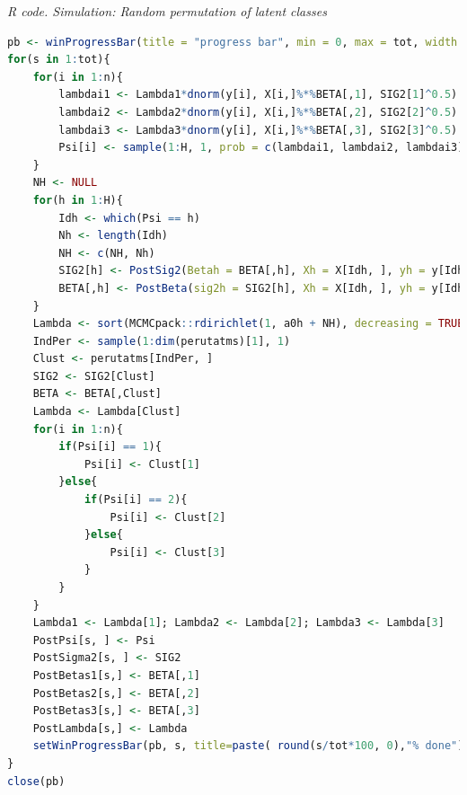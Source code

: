 \begin{enumerate}[leftmargin=*]
\begin{tcolorbox}[enhanced,width=4.67in,center upper,
	fontupper=\large\bfseries,drop shadow southwest,sharp corners]
	\textit{R code. Simulation: Random permutation of latent classes}
	\begin{VF}
		\begin{lstlisting}[language=R]
pb <- winProgressBar(title = "progress bar", min = 0, max = tot, width = 300)
for(s in 1:tot){
	for(i in 1:n){
		lambdai1 <- Lambda1*dnorm(y[i], X[i,]%*%BETA[,1], SIG2[1]^0.5)
		lambdai2 <- Lambda2*dnorm(y[i], X[i,]%*%BETA[,2], SIG2[2]^0.5)
		lambdai3 <- Lambda3*dnorm(y[i], X[i,]%*%BETA[,3], SIG2[3]^0.5)
		Psi[i] <- sample(1:H, 1, prob = c(lambdai1, lambdai2, lambdai3))
	}
	NH <- NULL
	for(h in 1:H){
		Idh <- which(Psi == h)
		Nh <- length(Idh)
		NH <- c(NH, Nh)
		SIG2[h] <- PostSig2(Betah = BETA[,h], Xh = X[Idh, ], yh = y[Idh])
		BETA[,h] <- PostBeta(sig2h = SIG2[h], Xh = X[Idh, ], yh = y[Idh])
	}
	Lambda <- sort(MCMCpack::rdirichlet(1, a0h + NH), decreasing = TRUE)
	IndPer <- sample(1:dim(perutatms)[1], 1)
	Clust <- perutatms[IndPer, ]
	SIG2 <- SIG2[Clust]
	BETA <- BETA[,Clust]
	Lambda <- Lambda[Clust]
	for(i in 1:n){
		if(Psi[i] == 1){
			Psi[i] <- Clust[1]
		}else{
			if(Psi[i] == 2){
				Psi[i] <- Clust[2]
			}else{
				Psi[i] <- Clust[3]
			}
		}
	}
	Lambda1 <- Lambda[1]; Lambda2 <- Lambda[2]; Lambda3 <- Lambda[3]
	PostPsi[s, ] <- Psi
	PostSigma2[s, ] <- SIG2
	PostBetas1[s,] <- BETA[,1]
	PostBetas2[s,] <- BETA[,2]
	PostBetas3[s,] <- BETA[,3]
	PostLambda[s,] <- Lambda 
	setWinProgressBar(pb, s, title=paste( round(s/tot*100, 0),"% done"))
}
close(pb)
\end{lstlisting}
	\end{VF}
\end{tcolorbox}


\end{enumerate}
